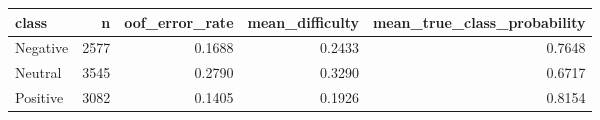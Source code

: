 \begin{tabular}{lrrrr}
\toprule
class & n & oof\_error\_rate & mean\_difficulty & mean\_true\_class\_probability \\
\midrule
Negative & 2577 & 0.1688 & 0.2433 & 0.7648 \\
Neutral & 3545 & 0.2790 & 0.3290 & 0.6717 \\
Positive & 3082 & 0.1405 & 0.1926 & 0.8154 \\
\bottomrule
\end{tabular}
